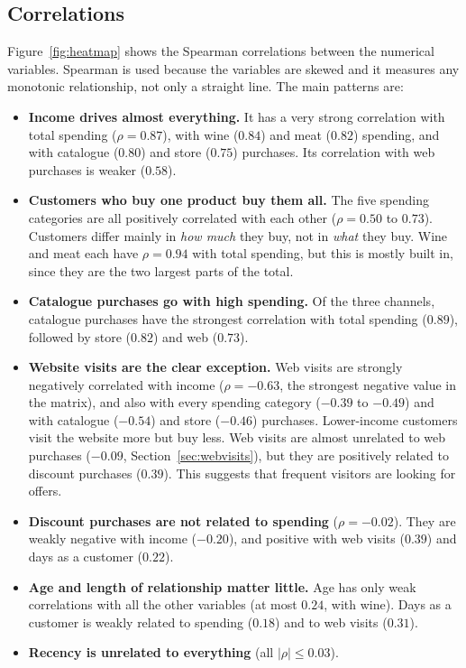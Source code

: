 \documentclass[11pt,a4paper]{article}
\begin{document}
\subsection{Correlations}
Figure~\ref{fig:heatmap} shows the Spearman correlations between the numerical variables. Spearman is used because the variables are skewed and it measures any monotonic relationship, not only a straight line.
The main patterns are:
\begin{itemize}
	\item \textbf{Income drives almost everything.} It has a very strong correlation with total spending ($\rho = 0.87$), with wine ($0.84$) and meat ($0.82$) spending, and with catalogue ($0.80$) and store ($0.75$) purchases. Its correlation with web purchases is weaker ($0.58$).
	\item \textbf{Customers who buy one product buy them all.} The five spending categories are all positively correlated with each other ($\rho = 0.50$ to $0.73$). Customers differ mainly in \emph{how much} they buy, not in \emph{what} they buy. Wine and meat each have $\rho = 0.94$ with total spending, but this is mostly built in, since they are the two largest parts of the total.
	\item \textbf{Catalogue purchases go with high spending.} Of the three channels, catalogue purchases have the strongest correlation with total spending ($0.89$), followed by store ($0.82$) and web ($0.73$).
	\item \textbf{Website visits are the clear exception.} Web visits are strongly negatively correlated with income ($\rho = -0.63$, the strongest negative value in the matrix), and also with every spending category ($-0.39$ to $-0.49$) and with catalogue ($-0.54$) and store ($-0.46$) purchases. Lower-income customers visit the website more but buy less. Web visits are almost unrelated to web purchases ($-0.09$, Section~\ref{sec:webvisits}), but they are positively related to discount purchases ($0.39$). This suggests that frequent visitors are looking for offers.
	\item \textbf{Discount purchases are not related to spending} ($\rho = -0.02$). They are weakly negative with income ($-0.20$), and positive with web visits ($0.39$) and days as a customer ($0.22$).
	\item \textbf{Age and length of relationship matter little.} Age has only weak correlations with all the other variables (at most $0.24$, with wine). Days as a customer is weakly related to spending ($0.18$) and to web visits ($0.31$).
	\item \textbf{Recency is unrelated to everything} (all $|\rho| \le 0.03$).
\end{itemize}
\end{document}
